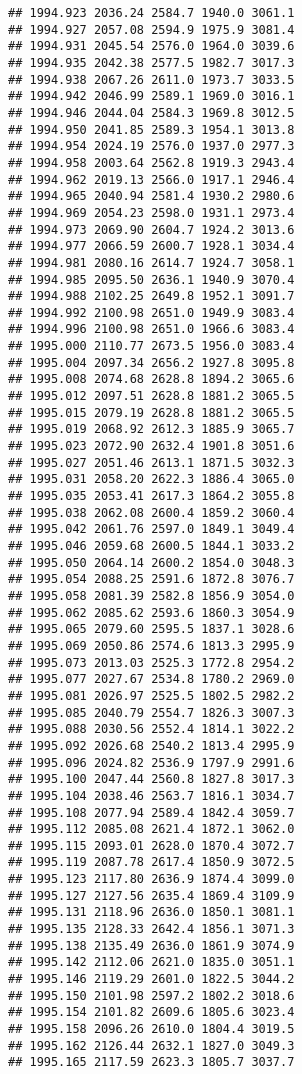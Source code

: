 \documentclass[
]{article}
\begin{document}
\begin{verbatim}
## 1994.923 2036.24 2584.7 1940.0 3061.1
## 1994.927 2057.08 2594.9 1975.9 3081.4
## 1994.931 2045.54 2576.0 1964.0 3039.6
## 1994.935 2042.38 2577.5 1982.7 3017.3
## 1994.938 2067.26 2611.0 1973.7 3033.5
## 1994.942 2046.99 2589.1 1969.0 3016.1
## 1994.946 2044.04 2584.3 1969.8 3012.5
## 1994.950 2041.85 2589.3 1954.1 3013.8
## 1994.954 2024.19 2576.0 1937.0 2977.3
## 1994.958 2003.64 2562.8 1919.3 2943.4
## 1994.962 2019.13 2566.0 1917.1 2946.4
## 1994.965 2040.94 2581.4 1930.2 2980.6
## 1994.969 2054.23 2598.0 1931.1 2973.4
## 1994.973 2069.90 2604.7 1924.2 3013.6
## 1994.977 2066.59 2600.7 1928.1 3034.4
## 1994.981 2080.16 2614.7 1924.7 3058.1
## 1994.985 2095.50 2636.1 1940.9 3070.4
## 1994.988 2102.25 2649.8 1952.1 3091.7
## 1994.992 2100.98 2651.0 1949.9 3083.4
## 1994.996 2100.98 2651.0 1966.6 3083.4
## 1995.000 2110.77 2673.5 1956.0 3083.4
## 1995.004 2097.34 2656.2 1927.8 3095.8
## 1995.008 2074.68 2628.8 1894.2 3065.6
## 1995.012 2097.51 2628.8 1881.2 3065.5
## 1995.015 2079.19 2628.8 1881.2 3065.5
## 1995.019 2068.92 2612.3 1885.9 3065.7
## 1995.023 2072.90 2632.4 1901.8 3051.6
## 1995.027 2051.46 2613.1 1871.5 3032.3
## 1995.031 2058.20 2622.3 1886.4 3065.0
## 1995.035 2053.41 2617.3 1864.2 3055.8
## 1995.038 2062.08 2600.4 1859.2 3060.4
## 1995.042 2061.76 2597.0 1849.1 3049.4
## 1995.046 2059.68 2600.5 1844.1 3033.2
## 1995.050 2064.14 2600.2 1854.0 3048.3
## 1995.054 2088.25 2591.6 1872.8 3076.7
## 1995.058 2081.39 2582.8 1856.9 3054.0
## 1995.062 2085.62 2593.6 1860.3 3054.9
## 1995.065 2079.60 2595.5 1837.1 3028.6
## 1995.069 2050.86 2574.6 1813.3 2995.9
## 1995.073 2013.03 2525.3 1772.8 2954.2
## 1995.077 2027.67 2534.8 1780.2 2969.0
## 1995.081 2026.97 2525.5 1802.5 2982.2
## 1995.085 2040.79 2554.7 1826.3 3007.3
## 1995.088 2030.56 2552.4 1814.1 3022.2
## 1995.092 2026.68 2540.2 1813.4 2995.9
## 1995.096 2024.82 2536.9 1797.9 2991.6
## 1995.100 2047.44 2560.8 1827.8 3017.3
## 1995.104 2038.46 2563.7 1816.1 3034.7
## 1995.108 2077.94 2589.4 1842.4 3059.7
## 1995.112 2085.08 2621.4 1872.1 3062.0
## 1995.115 2093.01 2628.0 1870.4 3072.7
## 1995.119 2087.78 2617.4 1850.9 3072.5
## 1995.123 2117.80 2636.9 1874.4 3099.0
## 1995.127 2127.56 2635.4 1869.4 3109.9
## 1995.131 2118.96 2636.0 1850.1 3081.1
## 1995.135 2128.33 2642.4 1856.1 3071.3
## 1995.138 2135.49 2636.0 1861.9 3074.9
## 1995.142 2112.06 2621.0 1835.0 3051.1
## 1995.146 2119.29 2601.0 1822.5 3044.2
## 1995.150 2101.98 2597.2 1802.2 3018.6
## 1995.154 2101.82 2609.6 1805.6 3023.4
## 1995.158 2096.26 2610.0 1804.4 3019.5
## 1995.162 2126.44 2632.1 1827.0 3049.3
## 1995.165 2117.59 2623.3 1805.7 3037.7

\end{verbatim}
\end{document}
